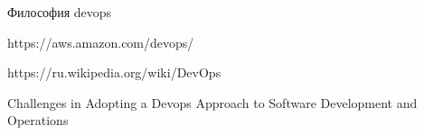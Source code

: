 

\begin{enumerate}[{label=[\arabic{*}]}]

\item Философия devops \label{book_effective_devops}

\item https://aws.amazon.com/devops/ \label{site_aws.amazon.com/devops}

\item https://ru.wikipedia.org/wiki/DevOps \label{site_ru.wikipedia.org/wiki/devops}

\item Challenges in Adopting a Devops Approach to Software Development and Operations \label{article_challenges_in_adopting_a_Devops}

\end{enumerate}
